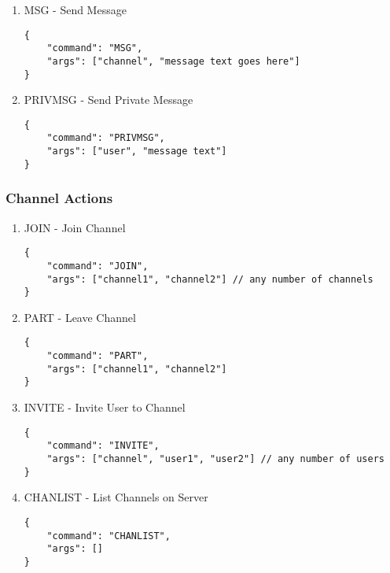 \documentclass[11pt]{article}
\begin{document}
\begin{enumerate}
\item MSG - Send Message
\label{sec-2-1-1-1}

\lstset{language=js,label= ,caption= ,numbers=none}
\begin{lstlisting}
{
    "command": "MSG",
    "args": ["channel", "message text goes here"]
}
\end{lstlisting}

\item PRIVMSG - Send Private Message
\label{sec-2-1-1-2}

\lstset{language=js,label= ,caption= ,numbers=none}
\begin{lstlisting}
{
    "command": "PRIVMSG",
    "args": ["user", "message text"]
}
\end{lstlisting}
\end{enumerate}


\subsubsection{Channel Actions}
\label{sec-2-1-2}

\begin{enumerate}
\item JOIN - Join Channel
\label{sec-2-1-2-1}

\lstset{language=js,label= ,caption= ,numbers=none}
\begin{lstlisting}
{
    "command": "JOIN",
    "args": ["channel1", "channel2"] // any number of channels
}
\end{lstlisting}

\item PART - Leave Channel
\label{sec-2-1-2-2}

\lstset{language=js,label= ,caption= ,numbers=none}
\begin{lstlisting}
{
    "command": "PART",
    "args": ["channel1", "channel2"]
}
\end{lstlisting}

\item INVITE - Invite User to Channel
\label{sec-2-1-2-3}

\lstset{language=js,label= ,caption= ,numbers=none}
\begin{lstlisting}
{
    "command": "INVITE",
    "args": ["channel", "user1", "user2"] // any number of users
}
\end{lstlisting}

\item CHANLIST - List Channels on Server
\label{sec-2-1-2-4}

\lstset{language=js,label= ,caption= ,numbers=none}
\begin{lstlisting}
{
    "command": "CHANLIST",
    "args": []
}
\end{lstlisting}
\end{enumerate}
\end{document}

